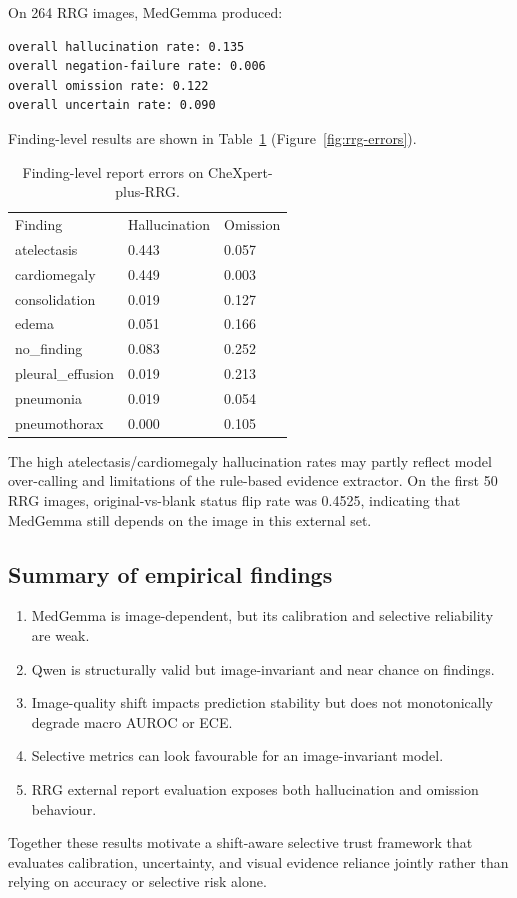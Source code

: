 On 264 RRG images, MedGemma produced:

\begin{verbatim}
overall hallucination rate: 0.135
overall negation-failure rate: 0.006
overall omission rate: 0.122
overall uncertain rate: 0.090
\end{verbatim}

Finding-level results are shown in Table~\ref{tab:rrg} (Figure~\ref{fig:rrg-errors}).

\begin{table}[t]
\centering
\small
\begin{tabular}{lll}
\hline
Finding & Hallucination & Omission \\
atelectasis & 0.443 & 0.057 \\
cardiomegaly & 0.449 & 0.003 \\
consolidation & 0.019 & 0.127 \\
edema & 0.051 & 0.166 \\
no\_finding & 0.083 & 0.252 \\
pleural\_effusion & 0.019 & 0.213 \\
pneumonia & 0.019 & 0.054 \\
pneumothorax & 0.000 & 0.105 \\
\hline
\end{tabular}
\caption{Finding-level report errors on CheXpert-plus-RRG.}
\label{tab:rrg}
\end{table}


The high atelectasis/cardiomegaly hallucination rates may partly reflect model over-calling and limitations of the rule-based evidence extractor. On the first 50 RRG images, original-vs-blank status flip rate was 0.4525, indicating that MedGemma still depends on the image in this external set.

\subsection{Summary of empirical findings}

\begin{enumerate}
\item MedGemma is image-dependent, but its calibration and selective reliability are weak.
\item Qwen is structurally valid but image-invariant and near chance on findings.
\item Image-quality shift impacts prediction stability but does not monotonically degrade macro AUROC or ECE.
\item Selective metrics can look favourable for an image-invariant model.
\item RRG external report evaluation exposes both hallucination and omission behaviour.
\end{enumerate}

Together these results motivate a shift-aware selective trust framework that evaluates calibration, uncertainty, and visual evidence reliance jointly rather than relying on accuracy or selective risk alone.
